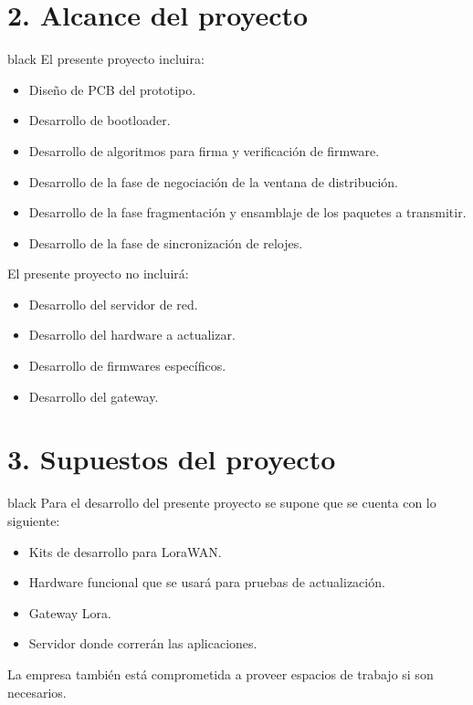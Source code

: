 \documentclass[11pt]{charter}
\begin{document}
\section{2. Alcance del proyecto}
\label{sec:alcance}

\begin{consigna}{black}
El presente proyecto incluira:
\begin{itemize}
	\item Diseño de PCB del prototipo.
	\item Desarrollo de bootloader.
	\item Desarrollo de algoritmos para firma y verificación de firmware.
	\item Desarrollo de la fase de negociación de la ventana de distribución.
	\item Desarrollo de la fase fragmentación y ensamblaje de los paquetes a transmitir.
	\item Desarrollo de la fase de sincronización de relojes.
\end{itemize}

El presente proyecto no incluirá:
\begin{itemize}
	\item Desarrollo del servidor de red.
	\item Desarrollo del hardware a actualizar.
	\item Desarrollo de firmwares específicos.
	\item Desarrollo del gateway.
\end{itemize}

\end{consigna}


\section{3. Supuestos del proyecto}
\label{sec:supuestos}

\begin{consigna}{black}
Para el desarrollo del presente proyecto se supone que se cuenta con lo siguiente:

\begin{itemize}
\item Kits de desarrollo para LoraWAN.
\item Hardware funcional que se usará para pruebas de actualización.
\item Gateway Lora.
\item Servidor donde correrán las aplicaciones.
\end{itemize}

La empresa también está comprometida a proveer espacios de trabajo si son necesarios.
\end{consigna}
\end{document}
